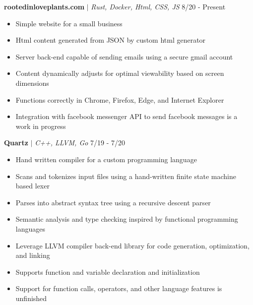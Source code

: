 \documentclass{article}
\newcommand{\project}[3]{\textbf{#1} $|$ \textit{#2} \hfill #3}
\newcommand{\makeListInner}[1]{\begin{itemize}[noitemsep,topsep=0pt] #1 \end{itemize}}
\newcommand{\makeList}[1]{\makeListInner{#1} \medskip}
\begin{document}
    \project{rootedinloveplants.com}{Rust, Docker, Html, CSS, JS}{8/20 - Present} \makeList{
        \item Simple website for a small business
        \item Html content generated from JSON by custom html generator
        \item Server back-end capable of sending emails using a secure gmail account
        \item Content dynamically adjusts for optimal viewability based on screen dimensions
        \item Functions correctly in Chrome, Firefox, Edge, and Internet Explorer
        \item Integration with facebook messenger API to send facebook messages is a work in progress
    }


    \project{Quartz}{C++, LLVM, Go}{7/19 - 7/20} \makeList {
        \item Hand written compiler for a custom programming language
        \item Scans and tokenizes input files using a hand-written finite state machine based lexer
        \item Parses into abstract syntax tree using a recursive descent parser
        \item Semantic analysis and type checking inspired by functional programming languages
        \item Leverage LLVM compiler back-end library for code generation, optimization, and linking
        \item Supports function and variable declaration and initialization
        \item Support for function calls, operators, and other language features is unfinished
    }
\end{document}
